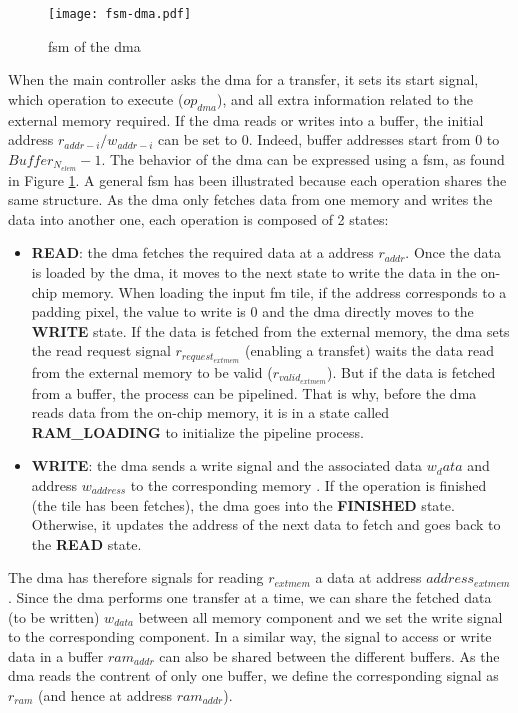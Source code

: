 %
\begin{figure}
    \centering
    \texttt{[image: fsm-dma.pdf]}
    \caption{\acrshort{fsm} of the \acrshort{dma}}
    \label{fig:fsm_dma}
\end{figure}
When the main controller asks the \acrshort{dma} for a transfer, it sets its start signal, which operation to execute ($op_{dma}$), and all extra information related to the external memory required. If the \acrshort{dma} reads or writes into a buffer, the initial address $r_{addr-i}/w_{addr-i}$ can be set to 0. Indeed, buffer addresses start from 0 to $Buffer_{N_{elem}} - 1$. The behavior of the \acrshort{dma} can be expressed using a \acrshort{fsm}, as found in Figure \ref{fig:fsm_dma}. A general \acrshort{fsm} has been illustrated because each operation shares the same structure. As the \acrshort{dma} only fetches data from one memory and writes the data into another one, each operation is composed of 2 states:
\begin{itemize}
    \item \textbf{READ}: the \acrshort{dma} fetches the required data at a address $r_{addr}$. Once the data is loaded by the \acrshort{dma}, it moves to the next state to write the data in the on-chip memory. When loading the input \acrshort{fm} tile, if the address corresponds to a padding pixel, the value to write is 0 and the \acrshort{dma} directly moves to the \textbf{WRITE} state. If the data is fetched from the external memory, the \acrshort{dma} sets the read request signal $r_{request_{extmem}}$ (enabling a transfet) waits the data read from the external memory to be valid ($r_{valid_{extmem}}$). But if the data is fetched from a buffer, the process can be pipelined. That is why, before the \acrshort{dma} reads data from the on-chip memory, it is in a state called \textbf{RAM\_LOADING} to initialize the pipeline process.
    \item \textbf{WRITE}: the \acrshort{dma} sends a write signal and the associated data $w_data$ and address $w_{address}$ to the corresponding memory . If the operation is finished (the tile has been fetches), the \acrshort{dma} goes into the \textbf{FINISHED} state. Otherwise, it updates the address of the next data to fetch and goes back to the \textbf{READ} state.
\end{itemize}

The \acrshort{dma} has therefore signals for reading $r_{extmem}$ a data at address $address_{extmem}$. Since the \acrshort{dma} performs one transfer at a time, we can share the fetched data (to be written) $w_{data}$ between all memory component and we set the write signal to the corresponding component. In a similar way, the signal to access or write data in a buffer $ram_{addr}$ can also be shared between the different buffers. As the \acrshort{dma} reads the contrent of only one buffer, we define the corresponding signal as $r_{ram}$ (and hence at address $ram_{addr}$).
%
